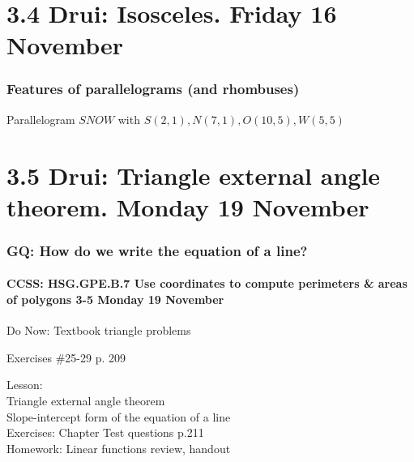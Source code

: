 \documentclass{beamer}
\begin{document}
    \section{3.4 Drui: Isosceles. Friday 16 November}
      \frame
      {
        \frametitle{Features of parallelograms (and rhombuses)}

      Parallelogram $SNOW$ with $S(2,1),N(7,1),O(10,5),W(5,5)$\\[0.5cm]
      }

    \section{3.5 Drui: Triangle external angle theorem. Monday 19 November}
      \frame
      {
        \frametitle{GQ: How do we write the equation of a line?}
        \framesubtitle{CCSS: HSG.GPE.B.7 Use coordinates to compute perimeters \& areas of polygons  \alert{3-5 Monday 19 November}}

        \begin{block}{Do Now: Textbook triangle problems}
          \item Exercises \#25-29 p. 209
        \end{block}
        Lesson: \\
        Triangle external angle theorem \\
        Slope-intercept form of the equation of a line\\
        Exercises: Chapter Test questions p.211 \\[0.5cm]
        Homework: Linear functions review, handout
      }
\end{document}
